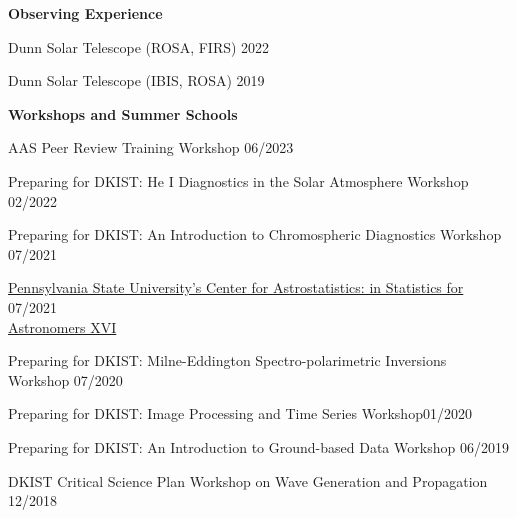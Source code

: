 \documentclass{resume} %
\begin{document}

\vspace{-0.1in}
\begin{rSection}{\textbf{Observing Experience}}
\vspace{0.02in}

{Dunn Solar Telescope (ROSA, FIRS)} \hfill{2022}

{Dunn Solar Telescope (IBIS, ROSA)} \hfill{2019}

\end{rSection} 


\vspace{-0.1in}
\begin{rSection}{\textbf{Workshops and Summer Schools}}
\vspace{0.02in}

{AAS Peer Review Training Workshop \hfill{06/2023}}

{Preparing for DKIST: He I Diagnostics in the Solar Atmosphere Workshop \hfill{02/2022}} 

{Preparing for DKIST: An Introduction to Chromospheric Diagnostics Workshop} \hfill{07/2021}

{\href{https://drive.google.com/file/d/1-ggYRQ9l34MkbHcc7GLWBdHFn_ISuwmg/view?usp=sharing}{Pennsylvania State University's Center for Astrostatistics: in Statistics for} \hfill{07/2021}} \\ {\href{https://drive.google.com/file/d/1-ggYRQ9l34MkbHcc7GLWBdHFn_ISuwmg/view?usp=sharing}{Astronomers XVI} }

{Preparing for DKIST: Milne-Eddington Spectro-polarimetric Inversions Workshop \hfill{07/2020}}

{Preparing for DKIST: Image Processing and Time Series Workshop\hfill{01/2020}}

{Preparing for DKIST: An Introduction to Ground-based Data  Workshop \hfill{06/2019}}

{DKIST Critical Science Plan Workshop on 
Wave Generation and Propagation \hfill{12/2018}}
\end{rSection} 


\end{document}
